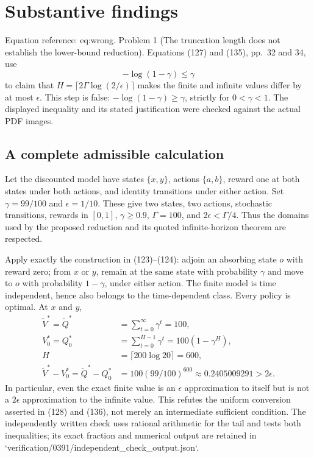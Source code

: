 \documentclass[10pt]{article}
\begin{document}
\section*{Substantive findings}
Equation reference: eq:wrong. Problem 1 (The truncation length does not establish the lower-bound reduction).  Equations (127) and (135), pp. 32 and 34, use \[
-\log(1-\gamma)\leq\gamma\] to claim that \(H=\lceil2\Gamma\log(2/\epsilon)\rceil\) makes the finite and infinite values differ by at most \(\epsilon\). This step is false: \(-\log(1-\gamma)\geq\gamma\), strictly for \(0<\gamma<1\). The displayed inequality and its stated justification were checked against the actual PDF images.\par
\subsection*{A complete admissible calculation}
Let the discounted model have states \(\{x,y\}\), actions \(\{a,b\}\), reward one at both states under both actions, and identity transitions under either action. Set \(\gamma=99/100\) and \(\epsilon=1/10\). These give two states, two actions, stochastic transitions, rewards in \([0,1]\), \(\gamma\geq0.9\), \(\Gamma=100\), and \(2\epsilon<\Gamma/4\). Thus the domains used by the proposed reduction and its quoted infinite-horizon theorem are respected.\par
Apply exactly the construction in (123)–(124): adjoin an absorbing state \(o\) with reward zero; from \(x\) or \(y\), remain at the same state with probability \(\gamma\) and move to \(o\) with probability \(1-\gamma\), under either action. The finite model is time independent, hence also belongs to the time-dependent class. Every policy is optimal. At \(x\) and \(y\), \[\begin{aligned}
\widetilde V^*=\widetilde Q^*&=\sum_{t=0}^{\infty}\gamma^t=100,\\
V_0^*=Q_0^*&=\sum_{t=0}^{H-1}\gamma^t
             =100(1-\gamma^H),\\
H&=\lceil200\log20\rceil=600,\\
\widetilde V^*-V_0^*=\widetilde Q^*-Q_0^*
 &=100(99/100)^{600}\approx0.2405009291>2\epsilon.\end{aligned}\] In particular, even the exact finite value is an \(\epsilon\) approximation to itself but is not a \(2\epsilon\) approximation to the infinite value. This refutes the uniform conversion asserted in (128) and (136), not merely an intermediate sufficient condition. The independently written check uses rational arithmetic for the tail and tests both inequalities; its exact fraction and numerical output are retained in `verification/0391/independent\_check\_output.json`.\par
\end{document}
